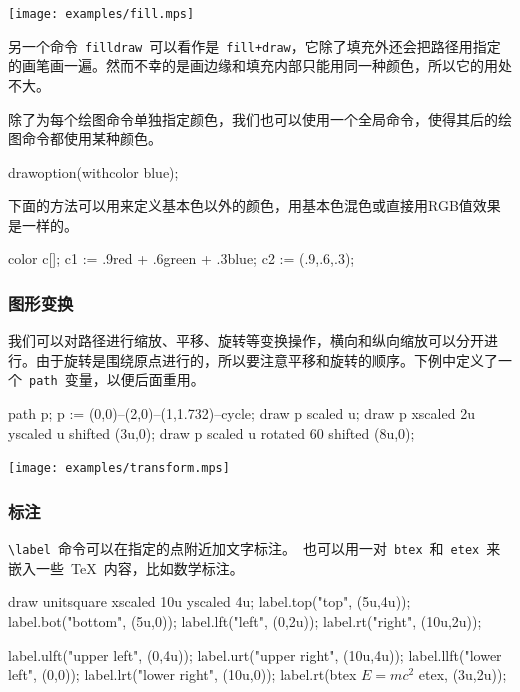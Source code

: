 \begin{out}
\texttt{[image: examples/fill.mps]}
\end{out}

另一个命令~\verb|filldraw|~可以看作是~\verb|fill+draw|，它除了填充外还会把路径用指定的画笔画一遍。然而不幸的是画边缘和填充内部只能用同一种颜色，所以它的用处不大。

除了为每个绘图命令单独指定颜色，我们也可以使用一个全局命令，使得其后的绘图命令都使用某种颜色。
\begin{code}
drawoption(withcolor blue);
\end{code}

下面的方法可以用来定义基本色以外的颜色，用基本色混色或直接用RGB值效果是一样的。

\begin{code}
color c[];
c1 := .9red + .6green + .3blue;
c2 := (.9,.6,.3);
\end{code}

\subsubsection{图形变换}
我们可以对路径进行缩放、平移、旋转等变换操作，横向和纵向缩放可以分开进行。由于旋转是围绕原点进行的，所以要注意平移和旋转的顺序。下例中定义了一个~\verb|path|~变量，以便后面重用。

\begin{code}
path p;
p := (0,0)--(2,0)--(1,1.732)--cycle;
draw p scaled u;
draw p xscaled 2u yscaled u shifted (3u,0);
draw p scaled u rotated 60 shifted (8u,0);
\end{code}

\begin{out}
\texttt{[image: examples/transform.mps]}
\end{out}

\subsubsection{标注}
\verb|\label|~命令可以在指定的点附近加文字标注。\MP~也可以用一对~\verb|btex|~和~\verb|etex|~来嵌入一些~\TeX~内容，比如数学标注。

\begin{code}
draw unitsquare xscaled 10u yscaled 4u;
label.top("top", (5u,4u));
label.bot("bottom", (5u,0));
label.lft("left", (0,2u));
label.rt("right", (10u,2u));
\end{code}
\begin{code}
label.ulft("upper left", (0,4u));
label.urt("upper right", (10u,4u));
label.llft("lower left", (0,0));
label.lrt("lower right", (10u,0));
label.rt(btex $E=mc^2$ etex, (3u,2u));
\end{code}

